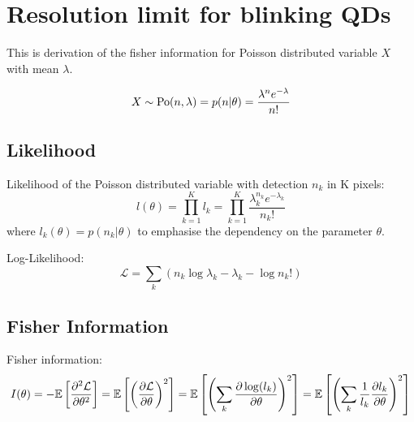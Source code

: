 \chapter{Resolution limit for blinking QDs\label{app:Resolution limit for the blinking QDs}}


This is derivation of the fisher information for Poisson distributed
variable $X$ with mean $\lambda$.

\begin{equation}
X\sim\mathrm{Po}(n,\lambda)=p(n|\theta)=\frac{\lambda^{n}e^{-\lambda}}{n!}
\end{equation}



\section{Likelihood}

Likelihood of the Poisson distributed variable with detection $n_k$ in K pixels: 
%
\begin{equation}
	l(\theta)=\prod_{k=1}^Kl_k=\prod_{k=1}^K\frac{\lambda_k^{n_k}e^{-\lambda_k}}{n_k!}\label{eq:app-Likelihood of Poisson}
\end{equation}
%
where $l_k(\theta)=p(n_k|\theta)$ to emphasise the dependency on the parameter $\theta$.

Log-Likelihood:
\begin{equation}
	\mathcal{L}=\sum_k\left(n_k\log\lambda_k-\lambda_k-\log n_k!\right)
\end{equation}


\section{Fisher Information}

Fisher information:
\begin{equation}
	I(\theta)=-\mathbb{E}\left[\frac{\partial^2\mathcal{L}}{\partial\theta^2}\right]=\mathbb{E}\left[\left(\frac{\partial\mathcal{L}}{\partial\theta}\right)^2\right]=\mathbb{E}\left[\left(\sum_k\frac{\partial\log(l_k)}{\partial\theta}\right)^2\right]=\mathbb{E}\left[\left(\sum_k\frac{1}{l_k}\frac{\partial l_k}{\partial\theta}\right)^2\right]\label{eq:app-Fisher Info Definition}
\end{equation}


